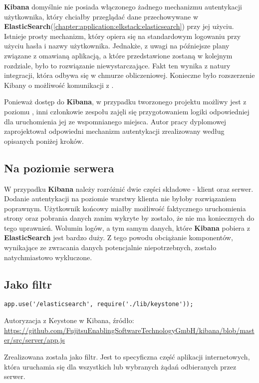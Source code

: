 \textbf{Kibana} domyślnie nie posiada włączonego żadnego mechanizmu autentykacji użytkownika, który
chciałby przeglądać dane przechowywane w \textbf{ElasticSearch}(\ref{chapter:application:elkstack:elasticsearch})
przy jej użyciu. Istnieje prosty mechanizm, który opiera się na standardowym logowaniu przy użyciu
hasła i nazwy użytkownika. Jednakże, z uwagi na późniejsze plany związane z omawianą aplikacją, a które 
przedstawione zostaną w kolejnym rozdziale, było to rozwiązanie niewystarczające. Fakt ten wynika z natury
integracji, która odbywa się w chmurze obliczeniowej. Konieczne było rozszerzenie Kibany o możliwość
komunikacji z .

Ponieważ dostęp do \textbf{Kibana}, w przypadku tworzonego projektu możliwy jest z poziomu , inni
członkowie zespołu zajęli się przygotowaniem logiki odpowiedniej dla uruchomienia jej ze wspomnianego miejsca. Autor pracy 
dyplomowej zaprojektował odpowiedni mechanizm autentykacji zrealizowany według opisanych poniżej kroków.

    \subsection{Na poziomie serwera}
    W przypadku \textbf{Kibana} należy rozróżnić dwie części składowe - klient oraz serwer. Dodanie autentykacji
    na poziomie warstwy klienta nie byłoby rozwiązaniem poprawnym. Użytkownik końcowy miałby możliwość faktycznego
    uruchomienia strony oraz pobrania danych zanim wykryte by zostało, że nie ma koniecznych do tego uprawnień.
    Wolumin logów, a tym samym danych, które \textbf{Kibana} pobiera z \textbf{ElasticSearch} jest bardzo duży.
    Z tego powodu obciążanie komponentów, wynikające ze zwracania danych potencjalnie niepotrzebnych, zostało
    natychmiastowo wykluczone. 
    
    \subsection{Jako filtr}
    \begin{listing}
        \begin{verbatim}
app.use('/elasticsearch', require('./lib/keystone'));
        \end{verbatim}
        \label{chapter:application_own:own_work:kibana_and_keystone:filter_code}
        \caption[Autoryzacja z Keystone w Kibana]{Autoryzacja z Keystone w Kibana, źródło: \url{https://github.com/FujitsuEnablingSoftwareTechnologyGmbH/kibana/blob/master/src/server/app.js}}
    \end{listing}
    Zrealizowana została jako filtr. Jest to specyficzna część aplikacji internetowych, która
    uruchamia się dla wszystkich lub wybranych żądań odbieranych przez serwer.
    
